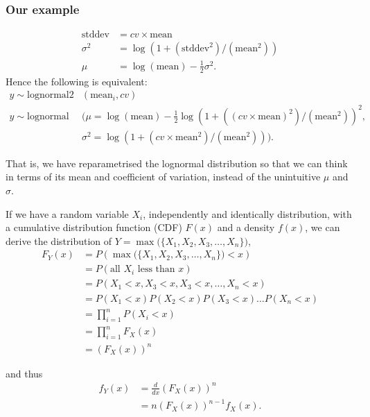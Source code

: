 \documentclass[usenames,dvipsnames]{beamer}
\begin{document}
\begin{frame}
\frametitle{Our example}
\begin{align*}
\text{stddev}   &= cv \times \text{mean} \\
\sigma^2 &=  \log( 1+( \text{stddev}^2 )/( \text{mean}^2 ) )   \\
\mu    &= \log( \text{mean} ) - \frac{1}{2} \sigma^2
\text{.}
\end{align*}
Hence the following is equivalent:
\begin{align*}
 y \sim \text{lognormal2}&( \text{mean}_i, cv) \\
 y \sim \text{lognormal} &\bigg(
 \mu    = \log( \text{mean} ) - \frac{1}{2}
           \log( 1+( (cv \times \text{mean})^2)/( \text{mean}^2 ) )^2
   , \\
 &\sigma^2 = \log( 1+( cv \times \text{mean}^2)/( \text{mean}^2 ) )
 \bigg)
 \text{.}
\end{align*}

That is, we have reparametrised the lognormal distribution so that we can think in terms of its mean and coefficient of variation, instead of the unintuitive $\mu$ and $\sigma$.


\end{frame}


\begin{frame}

If we have a random variable $X_i$, independently and identically distribution, with a cumulative distribution function (CDF) $F(x)$ and a density $f(x)$, we can derive the distribution of
$Y = \operatorname{max}\big(\{ X_1 , X_2 , X_3 , \ldots, X_n \} \big)$,
\begin{align*}
F_Y(x) &= P\left( \operatorname{max}\big(\{ X_1 , X_2 , X_3 , \ldots, X_n \} \big) < x \right) \\
   &= P\left( \text{all } X_i \text{ less than } x \right) \\
   &= P\left( X_1 < x, X_3 < x, X_3 < x, \ldots, X_n < x \right) \\
   &=   P( X_1 < x)
        P( X_2 < x)
        P( X_3 < x)
       \ldots
        P( X_n < x) \\
   &=   \prod_{i=1}^{n}{ P( X_i < x)} \\
   &=   \prod_{i=1}^{n}{ F_X(x) } \\
   &=   \left( F_X(x) \right)^n
\end{align*}

and thus
\begin{align*}
f_Y(x)
&= \frac{d}{dx}  \left( F_X(x) \right)^n  \\
&= n \left( F_X(x) \right)^{n-1} f_X(x)
\text{.}
\end{align*}

\end{frame}
\end{document}
